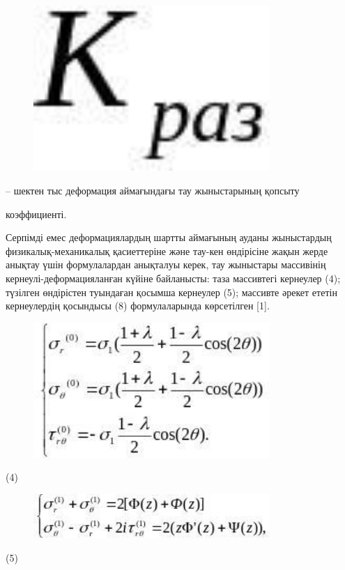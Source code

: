 \begin{figure}[H]
	\centering
	\includegraphics[width=0.8\textwidth]{assets/1273}
	\caption*{}
\end{figure} -- шектен тыс деформация
аймағындағы тау жыныстарының қопсыту

коэффициенті.

Серпімді емес деформациялардың шартты аймағының ауданы жыныстардың
физикалық-механикалық қасиеттеріне және тау-кен өндірісіне жақын жерде
анықтау үшін формулалардан анықталуы керек, тау жыныстары массивінің
кернеулі-деформацияланған күйіне байланысты: таза массивтегі кернеулер
(4); түзілген өндірістен туындаған қосымша кернеулер (5); массивте
әрекет ететін кернеулердің қосындысы (8) формулаларында көрсетілген
{[}1{]}.

\begin{figure}[H]
	\centering
	\includegraphics[width=0.8\textwidth]{assets/1274}
	\caption*{}
\end{figure} (4)

\begin{figure}[H]
	\centering
	\includegraphics[width=0.8\textwidth]{assets/1275}
	\caption*{}
\end{figure} (5)

